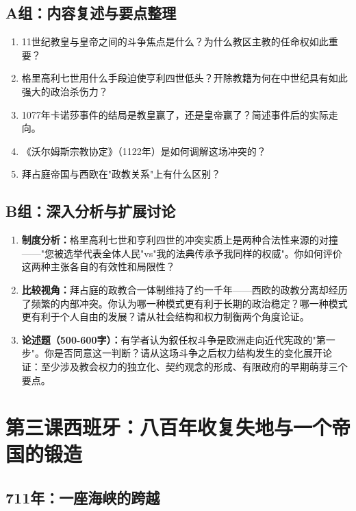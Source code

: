 \documentclass[a4paper,12pt]{ctexart}
\begin{document}
\subsection*{A组：内容复述与要点整理}

\begin{enumerate}[label=A\arabic*.]
  \item 11世纪教皇与皇帝之间的斗争焦点是什么？为什么教区主教的任命权如此重要？
  \item 格里高利七世用什么手段迫使亨利四世低头？开除教籍为何在中世纪具有如此强大的政治杀伤力？
  \item 1077年卡诺莎事件的结局是教皇赢了，还是皇帝赢了？简述事件后的实际走向。
  \item 《沃尔姆斯宗教协定》（1122年）是如何调解这场冲突的？
  \item 拜占庭帝国与西欧在"政教关系"上有什么区别？
\end{enumerate}

\subsection*{B组：深入分析与扩展讨论}

\begin{enumerate}[label=B\arabic*.]
  \item \textbf{制度分析：}格里高利七世和亨利四世的冲突实质上是两种合法性来源的对撞——"您被选举代表全体人民"vs"我的法典传承予我同样的权威"。你如何评价这两种主张各自的有效性和局限性？
  \item \textbf{比较视角：}拜占庭的政教合一体制维持了约一千年——西欧的政教分离却经历了频繁的内部冲突。你认为哪一种模式更有利于长期的政治稳定？哪一种模式更有利于个人自由的发展？请从社会结构和权力制衡两个角度论证。
  \item \textbf{论述题（500-600字）：}有学者认为叙任权斗争是欧洲走向近代宪政的"第一步"。你是否同意这一判断？请从这场斗争之后权力结构发生的变化展开论证：至少涉及教会权力的独立化、契约观念的形成、有限政府的早期萌芽三个要点。
\end{enumerate}

\newpage
\section{第三课\quad 西班牙：八百年收复失地与一个帝国的锻造}

\subsection{711年：一座海峡的跨越}
\end{document}
